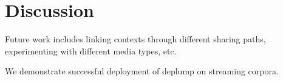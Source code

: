 \section{Discussion}
\label{sec:discussion}

Future work includes linking contexts through different sharing paths, experimenting with different media types, etc. 

We demonstrate successful deployment of deplump on streaming corpora.

